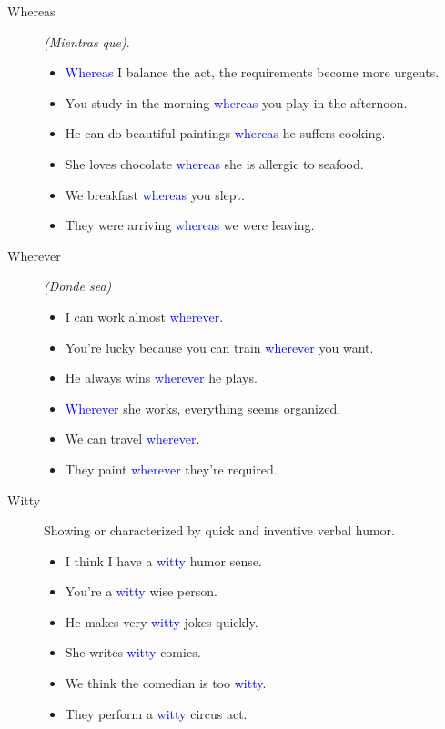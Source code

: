 \begin{multicols}{2}
\begin{description}
\item[Whereas] \emph{(Mientras que)}.
\begin{itemize}
\item \textcolor{blue}{Whereas} I balance the act, the requirements become more urgents.
\item You study in the morning \textcolor{blue}{whereas} you play in the afternoon.
\item He can do beautiful paintings \textcolor{blue}{whereas} he suffers cooking.
\item She loves chocolate \textcolor{blue}{whereas} she is allergic to seafood.
\item We breakfast \textcolor{blue}{whereas} you slept.
\item They were arriving \textcolor{blue}{whereas} we were leaving.
\end{itemize}

\item[Wherever] \emph{(Donde sea)}
\begin{itemize}
\item I can work almost \textcolor{blue}{wherever}.
\item You're lucky because you can train \textcolor{blue}{wherever} you want.
\item He always wins \textcolor{blue}{wherever} he plays.
\item \textcolor{blue}{Wherever} she  works, everything seems organized.
\item We can travel \textcolor{blue}{wherever}.
\item They paint \textcolor{blue}{wherever} they're required.
\end{itemize}

\item[Witty] Showing or characterized by quick and inventive verbal humor.
\begin{itemize}
\item I think I have a \textcolor{blue}{witty} humor sense.
\item You're a \textcolor{blue}{witty} wise person.
\item He makes very \textcolor{blue}{witty} jokes quickly.
\item She writes \textcolor{blue}{witty} comics.
\item We think the comedian is too \textcolor{blue}{witty}.
\item They perform a \textcolor{blue}{witty} circus act.
\end{itemize}


\end{description}
\end{multicols}
